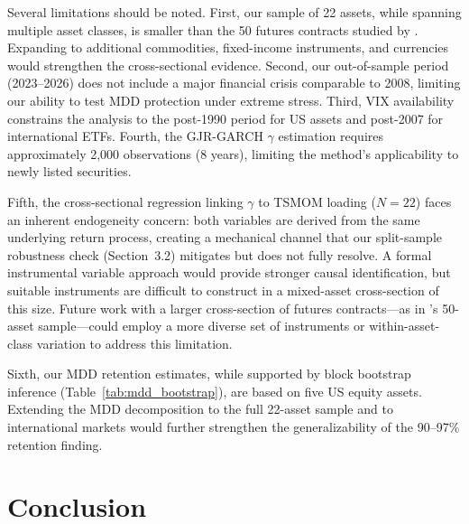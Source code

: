 Several limitations should be noted. First, our sample of 22 assets, while spanning multiple asset classes, is smaller than the 50 futures contracts studied by \citet{hood2025}. Expanding to additional commodities, fixed-income instruments, and currencies would strengthen the cross-sectional evidence. Second, our out-of-sample period (2023--2026) does not include a major financial crisis comparable to 2008, limiting our ability to test MDD protection under extreme stress. Third, VIX availability constrains the analysis to the post-1990 period for US assets and post-2007 for international ETFs. Fourth, the GJR-GARCH $\gamma$ estimation requires approximately 2,000 observations (8 years), limiting the method's applicability to newly listed securities.

Fifth, the cross-sectional regression linking $\gamma$ to TSMOM loading ($N = 22$) faces an inherent endogeneity concern: both variables are derived from the same underlying return process, creating a mechanical channel that our split-sample robustness check (Section~3.2) mitigates but does not fully resolve. A formal instrumental variable approach would provide stronger causal identification, but suitable instruments are difficult to construct in a mixed-asset cross-section of this size. Future work with a larger cross-section of futures contracts---as in \citet{hood2025}'s 50-asset sample---could employ a more diverse set of instruments or within-asset-class variation to address this limitation.

Sixth, our MDD retention estimates, while supported by block bootstrap inference (Table~\ref{tab:mdd_bootstrap}), are based on five US equity assets. Extending the MDD decomposition to the full 22-asset sample and to international markets would further strengthen the generalizability of the 90--97\% retention finding.


\section{Conclusion}

